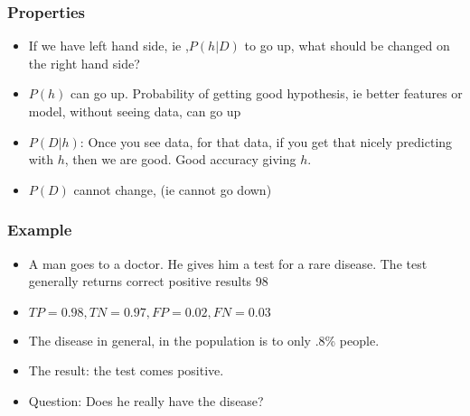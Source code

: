 \begin{frame}[fragile]\frametitle{Properties}

\begin{itemize}
\item If we have left hand side, ie ,$P(h|D)$ to go up, what should be changed on the right hand side?
\item $P(h)$ can go up. Probability of getting good hypothesis, ie better features or model, without seeing data, can go up
\item $P(D|h)$: Once you see data, for that data,  if you get that nicely predicting with $h$, then we are good. Good accuracy giving $h$.
\item $P(D)$ cannot change, (ie cannot go down)

\end{itemize}

\end{frame}

\begin{frame}[fragile]\frametitle{Example}

\begin{itemize}
\item A man goes to a doctor. He gives him a test for a rare disease. The test generally returns correct positive results 98%
\item $TP=0.98, TN=0.97, FP=0.02, FN=0.03$
\item The disease in general, in the population is to only .8\% people.
\item The result: the test comes positive.
\item Question: Does he really have the disease?


\end{itemize}

\end{frame}

